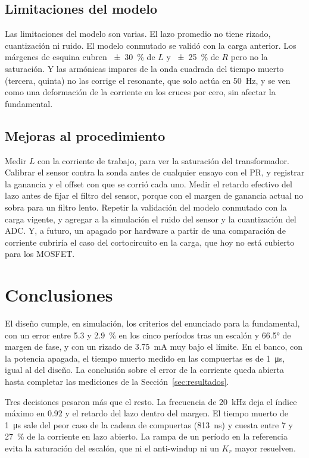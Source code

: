 \documentclass[journal]{IEEEtran}
\begin{document}
\subsection{Limitaciones del modelo}
Las limitaciones del modelo son varias. El lazo promedio no tiene rizado, cuantización ni ruido. El modelo conmutado se validó con la carga anterior. Los márgenes de esquina cubren \SI{\pm30}{\percent} de $L$ y \SI{\pm25}{\percent} de $R$ pero no la saturación. Y las armónicas impares de la onda cuadrada del tiempo muerto (tercera, quinta) no las corrige el resonante, que solo actúa en \SI{50}{Hz}, y se ven como una deformación de la corriente en los cruces por cero, sin afectar la fundamental.

\subsection{Mejoras al procedimiento}
Medir $L$ con la corriente de trabajo, para ver la saturación del transformador. Calibrar el sensor contra la sonda antes de cualquier ensayo con el PR, y registrar la ganancia y el offset con que se corrió cada uno. Medir el retardo efectivo del lazo antes de fijar el filtro del sensor, porque con el margen de ganancia actual no sobra para un filtro lento. Repetir la validación del modelo conmutado con la carga vigente, y agregar a la simulación el ruido del sensor y la cuantización del ADC. Y, a futuro, un apagado por hardware a partir de una comparación de corriente cubriría el caso del cortocircuito en la carga, que hoy no está cubierto para los MOSFET.

\section{Conclusiones}
\label{sec:conclusiones}
El diseño cumple, en simulación, los criterios del enunciado para la fundamental, con un error entre \num{5.3} y \SI{2.9}{\percent} en los cinco períodos tras un escalón y \ang{66.5} de margen de fase, y con un rizado de \SI{3.75}{mA} muy bajo el límite. En el banco, con la potencia apagada, el tiempo muerto medido en las compuertas es de \SI{1}{\micro s}, igual al del diseño. La conclusión sobre el error de la corriente queda abierta hasta completar las mediciones de la Sección~\ref{sec:resultados}.

Tres decisiones pesaron más que el resto. La frecuencia de \SI{20}{kHz} deja el índice máximo en \num{0.92} y el retardo del lazo dentro del margen. El tiempo muerto de \SI{1}{\micro s} sale del peor caso de la cadena de compuertas (\SI{813}{ns}) y cuesta entre \num{7} y \SI{27}{\percent} de la corriente en lazo abierto. La rampa de un período en la referencia evita la saturación del escalón, que ni el anti-windup ni un $K_r$ mayor resuelven.
\end{document}
